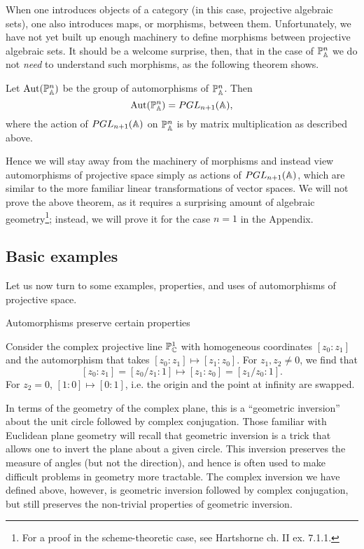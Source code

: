 \documentclass{../../mathnotes}
\begin{document}
When one introduces objects of a category (in this case, projective algebraic sets), one also introduces maps, or morphisms, between
them. Unfortunately, we have not yet built up enough machinery to define morphisms between projective algebraic sets.
It should be a welcome surprise, then, that in the case of $\mathbb{P}^n_{\mathbb{A}}$ we do not \textit{need} to understand such morphisms,
as the following theorem shows.

\begin{thm}
    Let $\operatorname{Aut}(\mathbb{P}^n_{\mathbb{A}})$ be the group of automorphisms of $\mathbb{P}^n_{\mathbb{A}}$. Then
    \[\operatorname{Aut}(\mathbb{P}^n_{\mathbb{A}})=PGL_{n+1}(\mathbb{A}),\]
    where the action of $PGL_{n+1}(\mathbb{A})$ on $\mathbb{P}^n_{\mathbb{A}}$ is by matrix multiplication as described above.
\end{thm}

Hence we will stay away from the machinery of morphisms and instead view automorphisms of projective space simply as actions of $PGL_{n+1}(\mathbb{A})$,
which are similar to the more familiar linear transformations of vector spaces. We will not prove the above theorem, as it requires a surprising
amount of algebraic geometry\footnote{For a proof in the scheme-theoretic case, see Hartshorne ch. II ex. 7.1.1.}; instead, we will prove it for
the case $n=1$ in the Appendix.

\subsection*{Basic examples}

Let us now turn to some examples, properties, and uses of automorphisms of projective space.

\begin{thm}
    Automorphisms preserve certain properties
\end{thm}

\begin{exmp}
\end{exmp}

\begin{exmp}
    Consider the complex projective line $\mathbb{P}^1_{\mathbb{C}}$ with homogeneous coordinates $[z_0:z_1]$ and the automorphism
    that takes $[z_0:z_1]\mapsto[z_1:z_0]$. For $z_1,z_2\neq0$, we find that
    \[ [z_0:z_1]=[z_0/z_1:1]\mapsto [z_1:z_0]=[z_1/z_0:1]. \]
    For $z_2=0$, $[1:0]\mapsto[0:1]$, i.e. the origin and the point at infinity are swapped.

    In terms of the geometry of the complex plane, this is a ``geometric inversion'' about the unit circle followed by complex conjugation.
    Those familiar with Euclidean plane geometry will recall that geometric inversion is a trick that allows one to
    invert the plane about a given circle. This inversion preserves the measure of angles (but not the direction), and hence
    is often used to make difficult problems in geometry more tractable. The complex inversion we have defined above,
    however, is geometric inversion followed by complex conjugation, but still preserves the non-trivial properties of
    geometric inversion.
\end{exmp}
\end{document}

